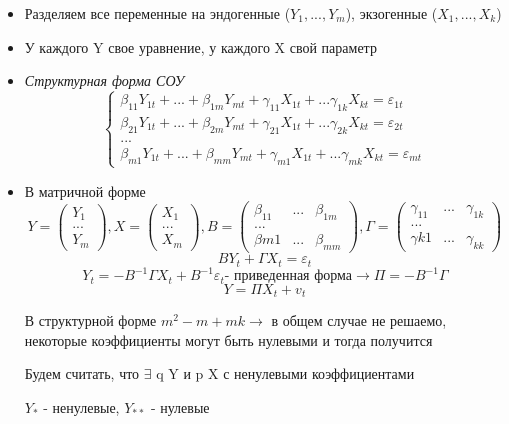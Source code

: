 \documentclass[a4paper, 12pt]{article}
\begin{document}
\begin{itemize}
    \item Разделяем все переменные на эндогенные ($Y_{1}, ..., Y_{m}$), экзогенные ($X_{1}, ..., X_{k}$)
    \item У каждого Y свое уравнение, у каждого X свой параметр
    \item \textit{Структурная форма СОУ}
    \[\begin{cases}
        \beta_{11}Y_{1t} + ... +  \beta_{1m}Y_{mt} + \gamma_{11}X_{1t} + ... \gamma_{1k}X_{kt} = \varepsilon_{1t}
        \\
        \beta_{21}Y_{1t} + ... +  \beta_{2m}Y_{mt} + \gamma_{21}X_{1t} + ... \gamma_{2k}X_{kt} = \varepsilon_{2t}
        \\
        ...
        \\
        \beta_{m1}Y_{1t} + ... +  \beta_{mm}Y_{mt} + \gamma_{m1}X_{1t} + ... \gamma_{mk}X_{kt} = \varepsilon_{mt}
    \end{cases}\]
    \item В матричной форме
    \[Y = \begin{pmatrix} Y_{1} \\ ...\\ Y_{m} \end{pmatrix}, X = \begin{pmatrix} X_{1} \\ ...\\ X_{m} \end{pmatrix}, B = \begin{pmatrix} \beta_{11} & ... & \beta_{1m} \\ ...\\ \beta{m1} & ... & \beta_{mm} \end{pmatrix}, \Gamma = \begin{pmatrix} \gamma_{11} & ... & \gamma_{1k} \\ ...\\ \gamma{k1} & ... & \gamma_{kk} \end{pmatrix}\]
    \[BY_{t} + \Gamma X_{t} = \varepsilon_{t}\]
    \[Y_{t} = -B^{-1}\Gamma X_{t} + B^{-1}\varepsilon_{t} \textrm{- приведенная форма} \rightarrow \Pi = -B^{-1}\Gamma\]
    \[Y = \Pi X_{t} + v_{t}\]
    
    В структурной форме $m^{2} - m + mk \rightarrow$ в общем случае не решаемо, некоторые коэффициенты могут быть нулевыми и тогда получится
    
    Будем считать, что $\exists$ q Y и p X с ненулевыми коэффициентами
    
    $Y_{*}$ -  ненулевые, $Y_{**}$ - нулевые
    

\end{itemize}
\end{document}
